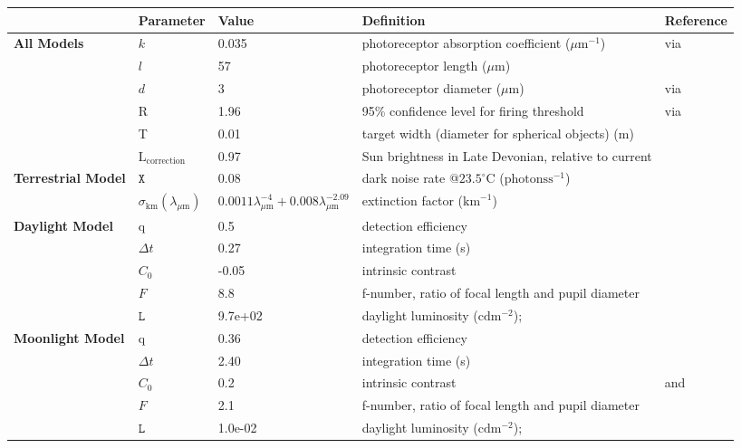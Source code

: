 \begin{tabular}{|L{3.5cm}|L{2cm}|L{2cm}|L{4.5cm}|L{4.5cm}|}
\hline
\textbf{ }&\textbf{Parameter}&\textbf{Value}&\textbf{Definition}&\textbf{Reference}\\\hline
\textbf{All Models}&$k$&0.035&photoreceptor absorption coefficient ($\mu \text{m}^{-1}$)&\cite{Part90a} via \cite{Warr98a}\\\hline
 &$l$&57&photoreceptor length ($\mu \text{m}$)&\cite{Nils14a}\\\hline
 &$d$&3&photoreceptor diameter ($\mu \text{m}$)&\cite{Land12a} via \cite{Nils14a}\\\hline
 &R&1.96&95\% confidence level for firing threshold&\cite{Land81a} via \cite{Nils14a}\\\hline
 &T&0.01&target width (diameter for spherical objects) (m)& \\\hline
 &$\text{L}_{\text{correction}}$&0.97&Sun brightness in Late Devonian, relative to current&\cite{Bahc01a}\\\hline
\textbf{Terrestrial Model}&$\mathtt{X}$&0.08&dark noise rate @$23.5^{\circ} \text{C}$ ($\text{photons} \text{s}^{-1}$)&\cite{Aho93a}\\\hline
 &$\sigma_{\text{km}} (\lambda_{\mu \text{m}})$&$0.0011 \lambda_{\mu \text{m}}^{-4} + 0.008 \lambda_{\mu \text{m}}^{-2.09}$&extinction factor ($\text{km}^{-1}$)&\cite{Midd52a}\\\hline
\textbf{Daylight Model}&q&0.5&detection efficiency&\cite{Pirh07a}\\\hline
 &$\Delta t$&0.27&integration time (s)&\cite{Donn95a}\\\hline
 &$C_{0}$&-0.05&intrinsic contrast&\cite{Blac46a}\\\hline
 &$F$&8.8&f-number, ratio of focal length and pupil diameter&\cite{Mill79a}\\\hline
 &$\mathtt{L}$&9.7e+02&daylight luminosity ($\text{cd} \text{m}^{-2}$);&\cite{Midd52a}\\\hline
\textbf{Moonlight Model}&q&0.36&detection efficiency&\cite{Nils14a}\\\hline
 &$\Delta t$&2.40&integration time (s)&\cite{Donn95a}\\\hline
 &$C_{0}$&0.2&intrinsic contrast&\cite{Hest68a} and \cite{Blac46a}\\\hline
 &$F$&2.1&f-number, ratio of focal length and pupil diameter&\cite{Mill79a}\\\hline
 &$\mathtt{L}$&1.0e-02&daylight luminosity ($\text{cd} \text{m}^{-2}$);&\cite{Midd52a}\\\hline

\end{tabular}
